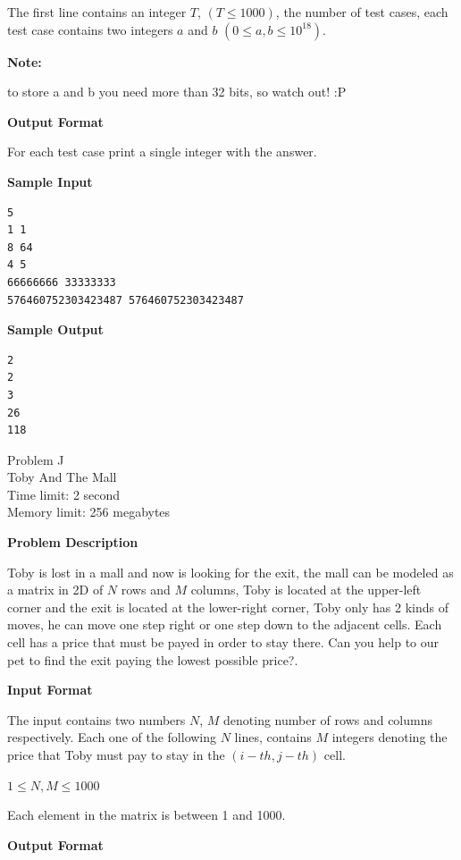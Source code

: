 \documentclass[11pt]{article}
\begin{document}
The first line contains an integer $T$, $(T \le 1000)$, the number of test cases,
each test case contains two integers $a$ and $b$ $(0 \le a,b \le 10^{18})$.

\textbf{\large Note:}

to store a and b you need more than 32 bits, so watch out! :P

\textbf{\large Output Format}

For each test case print a single integer with the answer.

\textbf{\large Sample Input}

\begin{verbatim}
5
1 1
8 64
4 5
66666666 33333333
576460752303423487 576460752303423487
\end{verbatim}

\textbf{\large Sample Output}

\begin{verbatim}
2
2
3
26
118
\end{verbatim}

\newpage

        \begin{center}
            {\LARGE Problem J}\\
            {\Large Toby And The Mall}\\
            {Time limit: 2 second}\\
            {Memory limit: 256 megabytes}
        \end{center}\textbf{\large Problem Description}

Toby is lost in a mall and now is looking for the exit, the mall can be modeled
as a matrix in 2D of $N$ rows and $M$ columns, Toby is located at the upper-left
corner and the exit is located at the lower-right corner, Toby only has 2
kinds of moves, he can move one step right or one step down to the adjacent
cells. Each cell has a price that must be payed in order to stay there.
Can you help to our pet to find the exit paying the lowest possible price?.

\textbf{\large Input Format}

The input contains two numbers $N$, $M$ denoting number of rows and columns respectively.
Each one of the following $N$ lines, contains $M$ integers denoting the price that
Toby must pay to stay in the $(i-th, j-th)$ cell.

$1 \le N, M \le 1000$

Each element in the matrix is between 1 and 1000.

\textbf{\large Output Format}
\end{document}
